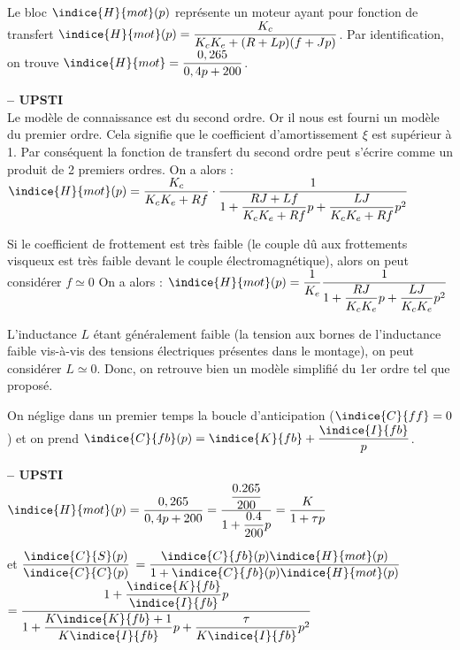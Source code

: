 Le bloc  $\indice{H}{mot} (p)$ représente un moteur ayant pour fonction de transfert
$\indice{H}{mot} (p)=\dfrac{K_c}{K_c K_e+(R+Lp)( f +Jp)}$. Par identification, on trouve $\indice{H}{mot}= \dfrac{0,265}{0,4 p+200}$.

\fi

\ifprof
\begin{corrige}\textbf{ -- UPSTI}\\ 
Le modèle de connaissance est du second ordre. Or il nous est fourni un modèle du premier ordre. Cela signifie que le coefficient d’amortissement $\xi$ est supérieur à 1. Par conséquent la fonction de transfert du second ordre peut s’écrire comme un produit de 2 premiers ordres.
On a alors :
$\indice{H}{mot} (p)=\dfrac{K_c}{K_c K_e+Rf} \cdot \dfrac{1}{1+\dfrac{RJ+Lf}{K_c K_e+Rf}p+\dfrac{LJ}{K_c K_e+Rf}p^2}$ 
 
Si le coefficient de frottement est très faible (le couple dû aux frottements visqueux est très faible devant le couple électromagnétique), alors on peut considérer $f\simeq 0$
On a alors :
$\indice{H}{mot}(p)=\dfrac{1}{K_e} \dfrac{1}{1+\dfrac{RJ}{K_c K_e } p+\dfrac{LJ}{K_c K_e }p^2}$

L’inductance $L$ étant généralement faible (la tension aux bornes de l’inductance faible vis-à-vis des tensions électriques présentes dans le montage), on peut considérer $ L \simeq 0$.
Donc, on retrouve bien un modèle simplifié du 1er ordre tel que proposé.
 

\end{corrige}
\else
\fi

On néglige dans un premier temps la boucle d'anticipation ($\indice{C}{ff} =0$) et on prend
$\indice{C}{fb}( p)=\indice{K}{fb}+\dfrac{\indice{I}{fb}}{p}$.

\ifprof
\begin{corrige}\textbf{ -- UPSTI}\\ 
$\indice{H}{mot} (p)=\dfrac{0,265}{0,4p+200}=\dfrac{\dfrac{0.265}{200}}{1+\dfrac{0.4}{200} p}=\dfrac{K}{1+\tau p}$

et $\dfrac{\indice{C}{S}(p)}{\indice{C}{C}(p)} $
$=\dfrac{\indice{C}{fb} (p) \indice{H}{mot} (p)}{1+\indice{C}{fb} (p) \indice{H}{mot} (p)}$
$=\dfrac{1+\dfrac{\indice{K}{fb}}{\indice{I}{fb}}  p}{1+\dfrac{K\indice{K}{fb}+1}{K\indice{I}{fb}} p+\dfrac{\tau}{K\indice{I}{fb} } p^2}$


\end{corrige}
\else
\fi

